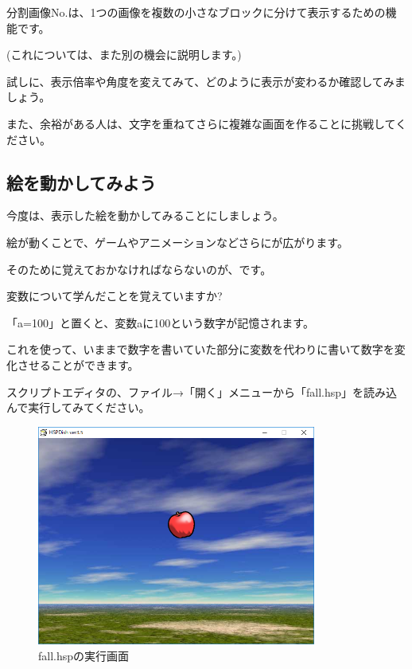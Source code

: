 分割画像No.は、1つの画像を複数の小さなブロックに分けて表示するための機能です。

(これについては、また別の機会に説明します。)

試しに、表示倍率や角度を変えてみて、どのように表示が変わるか確認してみましょう。

また、余裕がある人は、文字を重ねてさらに複雑な画面を作ることに挑戦してください。



\newpage
\subsection{絵を動かしてみよう}



今度は、表示した絵を動かしてみることにしましょう。

絵が動くことで、ゲームやアニメーションなどさらにが広がります。

そのために覚えておかなければならないのが、です。


変数について学んだことを覚えていますか?


\begin{description}
    \item {}
    \item {}
    \item {}
    \item {}
\end{description}

「a=100」と置くと、変数aに100という数字が記憶されます。

これを使って、いままで数字を書いていた部分に変数を代わりに書いて数字を変化させることができます。

スクリプトエディタの、ファイル→「開く」メニューから「fall.hsp」を読み込んで実行してみてください。



\begin{figure}[H]
    \begin{center}
      \includegraphics[keepaspectratio,width=9.183cm,height=7.241cm]{text04-img/s_fall.png}
      \caption{fall.hspの実行画面}
    \end{center}
    \label{fig:prog_menu}
\end{figure}


